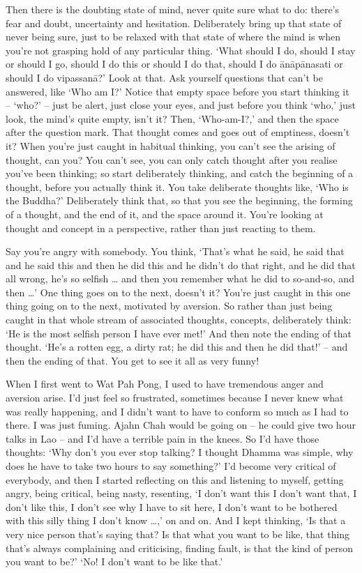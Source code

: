 Then there is the doubting state of mind, never quite sure what to do: there's fear and doubt, uncertainty and hesitation. Deliberately bring up that state of never being sure, just to be relaxed with that state of where the mind is when you're not grasping hold of any particular thing. `What should I do, should I stay or should I go, should I do this or should I do that, should I do ānāpānasati or should I do vipassanā?' Look at that. Ask yourself questions that can't be answered, like `Who am I?' Notice that empty space before you start thinking it -- `who?' -- just be alert, just close your eyes, and just before you think `who,' just look, the mind's quite empty, isn't it? Then, `Who-am-I?,' and then the space after the question mark. That thought comes and goes out of emptiness, doesn't it? When you're just caught in habitual thinking, you can't see the arising of thought, can you? You can't see, you can only catch thought after you realise you've been thinking; so start deliberately thinking, and catch the beginning of a thought, before you actually think it. You take deliberate thoughts like, `Who is the Buddha?' Deliberately think that, so that you see the beginning, the forming of a thought, and the end of it, and the space around it. You're looking at thought and concept in a perspective, rather than just reacting to them.

Say you're angry with somebody. You think, `That's what he said, he said that and he said this and then he did this and he didn't do that right, and he did that all wrong, he's so selfish \ldots{} and then you remember what he did to so-and-so, and then \ldots{}' One thing goes on to the next, doesn't it? You're just caught in this one thing going on to the next, motivated by aversion. So rather than just being caught in that whole stream of associated thoughts, concepts, deliberately think: `He is the most selfish person I have ever met!' And then note the ending of that thought. `He's a rotten egg, a dirty rat; he did this and then he did that!' -- and then the ending of that. You get to see it all as very funny!

When I first went to Wat Pah Pong, I used to have tremendous anger and aversion arise. I'd just feel so frustrated, sometimes because I never knew what was really happening, and I didn't want to have to conform so much as I had to there. I was just fuming. Ajahn Chah would be going on -- he could give two hour talks in Lao -- and I'd have a terrible pain in the knees. So I'd have those thoughts: `Why don't you ever stop talking? I thought Dhamma was simple, why does he have to take two hours to say something?' I'd become very critical of everybody, and then I started reflecting on this and listening to myself, getting angry, being critical, being nasty, resenting, `I don't want this I don't want that, I don't like this, I don't see why I have to sit here, I don't want to be bothered with this silly thing I don't know \ldots{},' on and on. And I kept thinking, `Is that a very nice person that's saying that? Is that what you want to be like, that thing that's always complaining and criticising, finding fault, is that the kind of person you want to be?' `No! I don't want to be like that.'


